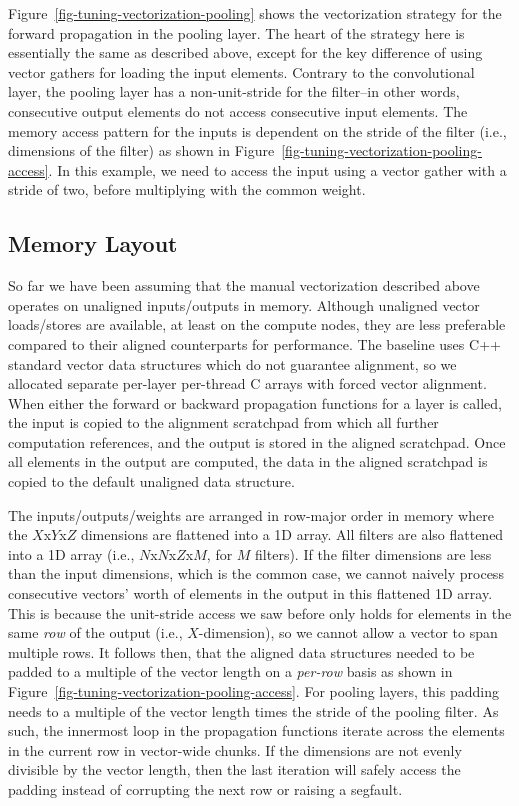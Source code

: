 


Figure~\ref{fig-tuning-vectorization-pooling} shows the vectorization
strategy for the forward propagation in the pooling layer. The heart of
the strategy here is essentially the same as described above, except for
the key difference of using vector gathers for loading the input
elements. Contrary to the convolutional layer, the pooling layer has a
non-unit-stride for the filter--in other words, consecutive output
elements do not access consecutive input elements. The memory access
pattern for the inputs is dependent on the stride of the filter (i.e.,
dimensions of the filter) as shown in
Figure~\ref{fig-tuning-vectorization-pooling-access}. In this example, we
need to access the input using a vector gather with a stride of two,
before multiplying with the common weight.

\subsection{Memory Layout}
\label{sec-tuning-memory}

So far we have been assuming that the manual vectorization described
above operates on unaligned inputs/outputs in memory. Although unaligned
vector loads/stores are available, at least on the compute nodes, they
are less preferable compared to their aligned counterparts for
performance. The baseline uses C++ standard vector data structures which
do not guarantee alignment, so we allocated separate per-layer per-thread
C arrays with forced vector alignment. When either the forward or
backward propagation functions for a layer is called, the input is copied
to the alignment scratchpad from which all further computation
references, and the output is stored in the aligned scratchpad. Once all
elements in the output are computed, the data in the aligned scratchpad
is copied to the default unaligned data structure.

The inputs/outputs/weights are arranged in row-major order in memory
where the $X$x$Y$x$Z$ dimensions are flattened into a 1D array. All
filters are also flattened into a 1D array (i.e., $N$x$N$x$Z$x$M$, for
$M$ filters). If the filter dimensions are less than the input
dimensions, which is the common case, we cannot naively process
consecutive vectors' worth of elements in the output in this flattened 1D
array. This is because the unit-stride access we saw before only holds
for elements in the same \emph{row} of the output (i.e., $X$-dimension),
so we cannot allow a vector to span multiple rows. It follows then, that
the aligned data structures needed to be padded to a multiple of the
vector length on a \emph{per-row} basis as shown in
Figure~\ref{fig-tuning-vectorization-pooling-access}. For pooling layers,
this padding needs to a multiple of the vector length times the stride of
the pooling filter. As such, the innermost loop in the propagation
functions iterate across the elements in the current row in vector-wide
chunks. If the dimensions are not evenly divisible by the vector length,
then the last iteration will safely access the padding instead of
corrupting the next row or raising a segfault.


